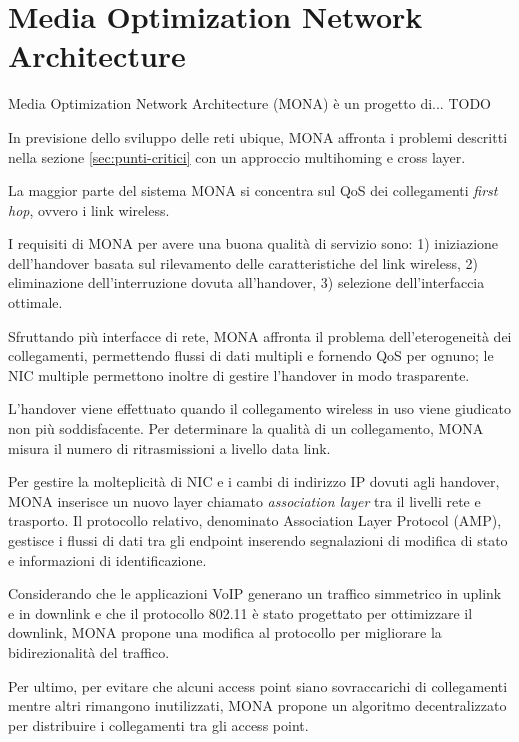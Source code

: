 \documentclass[12pt,a4paper,openright,twoside]{book}
\begin{document}
\chapter{Media Optimization Network Architecture}

Media Optimization Network Architecture (MONA) è un progetto
di... TODO

In previsione dello sviluppo delle reti ubique, MONA affronta i
problemi descritti nella sezione \ref{sec:punti-critici} con un
approccio multihoming e cross layer.

La maggior parte del sistema MONA si concentra sul QoS dei
collegamenti \emph{first hop}, ovvero i link wireless.

I requisiti di MONA per avere una buona qualità di servizio sono:
1) iniziazione dell'handover basata sul rilevamento delle
caratteristiche del link wireless, 2) eliminazione dell'interruzione
dovuta all'handover, 3) selezione dell'interfaccia ottimale.

Sfruttando più interfacce di rete, MONA affronta il problema
dell'eterogeneità dei collegamenti, permettendo flussi di dati
multipli e fornendo QoS per ognuno; le NIC multiple permettono inoltre
di gestire l'handover in modo trasparente.

L'handover viene effettuato quando il collegamento wireless in uso
viene giudicato non più soddisfacente. Per determinare la qualità di
un collegamento, MONA misura il numero di ritrasmissioni a livello
data link.

Per gestire la molteplicità di NIC e i cambi di indirizzo IP dovuti
agli handover, MONA inserisce un nuovo layer chiamato
\emph{association layer} tra il livelli rete e trasporto. Il
protocollo relativo, denominato Association Layer Protocol (AMP),
gestisce i flussi di dati tra gli endpoint inserendo segnalazioni di
modifica di stato e informazioni di identificazione.

Considerando che le applicazioni VoIP generano un traffico simmetrico
in uplink e in downlink e che il protocollo 802.11 è stato progettato
per ottimizzare il downlink, MONA propone una modifica al protocollo
per migliorare la bidirezionalità del traffico.

Per ultimo, per evitare che alcuni access point siano sovraccarichi di
collegamenti mentre altri rimangono inutilizzati, MONA propone un
algoritmo decentralizzato per distribuire i collegamenti tra gli
access point.


\end{document}
